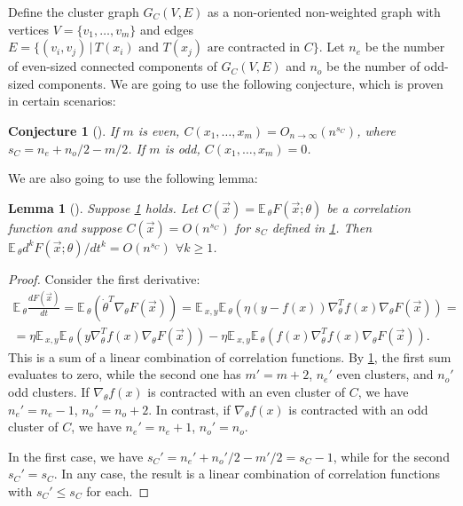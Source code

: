 \documentclass{article}
\newcommand{\EE}{\mathbb{E}\,}
\newtheorem{lemma}{Lemma}
\newtheorem{conjecture}{Conjecture}
\begin{document}
    Define the cluster graph $G_C(V,E)$ as a non-oriented non-weighted graph with vertices $V = \{v_1, \ldots, v_m\}$ and edges $E = \{(v_i,v_j) \, | \, \text{$T(x_i)$ and $T(x_j)$ are contracted in $C$}\}$.
    Let $n_e$ be the number of even-sized connected components of $G_C(V,E)$ and $n_o$ be the number of odd-sized components.
    We are going to use the following conjecture, which is proven in certain scenarios:
    \begin{conjecture}[\cite{Dyer2020Asymptotics}]
        \label{conj:C_asymptotics}
        If $m$ is even, $C(x_1,\ldots,x_m) = O_{n\to\infty}(n^{s_C})$, where $s_C = n_e + n_o / 2 - m / 2$.
        If $m$ is odd, $C(x_1,\ldots,x_m) = 0$.
    \end{conjecture}

    We are also going to use the following lemma:
    \begin{lemma}[\cite{Dyer2020Asymptotics}]
        \label{lemma:derivative_asymptotics}
        Suppose \cref{conj:C_asymptotics} holds.
        Let $C(\vec x) = \EE_\theta F(\vec x; \theta)$ be a correlation function and suppose $C(\vec x) = O(n^{s_C})$ for $s_C$ defined in \cref{conj:C_asymptotics}.
        Then $\EE_\theta d^k F(\vec x; \theta) / dt^k = O(n^{s_C})$ $\forall k \geq 1$.
    \end{lemma}
    \begin{proof}
        Consider the first derivative:
        \begin{multline}
            \EE_\theta \frac{dF(\vec x)}{dt} =
            \EE_\theta (\dot\theta^T \nabla_\theta F(\vec x)) =
            \EE_{x,y} \EE_\theta (\eta (y - f(x)) \nabla^T_\theta f(x) \nabla_\theta F(\vec x)) =\\=
            \eta \EE_{x,y} \EE_\theta (y \nabla^T_\theta f(x) \nabla_\theta F(\vec x)) -
            \eta \EE_{x,y} \EE_\theta (f(x) \nabla^T_\theta f(x) \nabla_\theta F(\vec x)).
        \end{multline}
        This is a sum of a linear combination of correlation functions.
        By \cref{conj:C_asymptotics}, the first sum evaluates to zero, while the second one has $m' = m+2$, $n_e'$ even clusters, and $n_o'$ odd clusters.
        If $\nabla_\theta f(x)$ is contracted with an even cluster of $C$, we have $n_e' = n_e - 1$, $n_o' = n_o + 2$.
        In contrast, if $\nabla_\theta f(x)$ is contracted with an odd cluster of $C$, we have $n_e' = n_e + 1$, $n_o' = n_o$.
        
        In the first case, we have $s_C' = n_e' + n_o'/2 - m'/2 = s_C - 1$, while for the second $s_C' = s_C$.
        In any case, the result is a linear combination of correlation functions with $s_C' \leq s_C$ for each.
    \end{proof}
\end{document}
